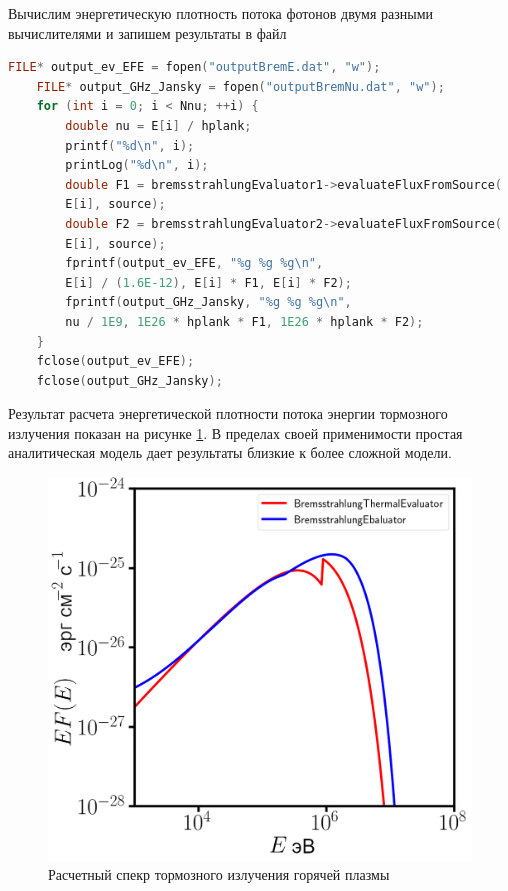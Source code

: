 Вычислим энергетическую плотность потока фотонов двумя разными вычислителями и запишем результаты в файл

\begin{lstlisting}[language=c++]
	FILE* output_ev_EFE = fopen("outputBremE.dat", "w");
	FILE* output_GHz_Jansky = fopen("outputBremNu.dat", "w");
	for (int i = 0; i < Nnu; ++i) {
		double nu = E[i] / hplank;
		printf("%d\n", i);
		printLog("%d\n", i);
		double F1 = bremsstrahlungEvaluator1->evaluateFluxFromSource(
		E[i], source);
		double F2 = bremsstrahlungEvaluator2->evaluateFluxFromSource(
		E[i], source);
		fprintf(output_ev_EFE, "%g %g %g\n",
		E[i] / (1.6E-12), E[i] * F1, E[i] * F2);
		fprintf(output_GHz_Jansky, "%g %g %g\n",
		nu / 1E9, 1E26 * hplank * F1, 1E26 * hplank * F2);
	}
	fclose(output_ev_EFE);
	fclose(output_GHz_Jansky);
\end{lstlisting}

Результат расчета энергетической плотности потока энергии тормозного излучения показан на рисунке \ref{bremsstrahlungFigure}. В пределах своей применимости простая аналитическая модель дает результаты близкие к более сложной модели. 

\begin{figure}
	\centering
	\includegraphics[width=12.5 cm]{./fig/bremsstrahlung.png} 
	\caption{Расчетный спекр тормозного излучения горячей плазмы}
	\label{bremsstrahlungFigure}
\end{figure}

